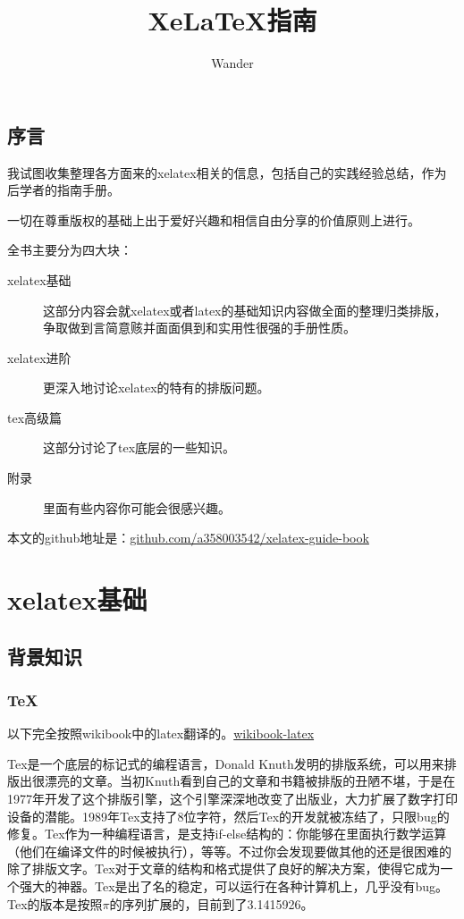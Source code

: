 \documentclass[12pt,oneside]{book}
\title{XeLaTeX指南}
\author{Wander}
\begin{document}


\frontmatter 
{}
\chapter*{序言}
我试图收集整理各方面来的xelatex相关的信息，包括自己的实践经验总结，作为后学者的指南手册。

一切在尊重版权的基础上出于爱好兴趣和相信自由分享的价值原则上进行。

全书主要分为四大块：
\begin{description}
\item[xelatex基础] 这部分内容会就xelatex或者latex的基础知识内容做全面的整理归类排版，争取做到言简意赅并面面俱到和实用性很强的手册性质。

\item[xelatex进阶] 更深入地讨论xelatex的特有的排版问题。

\item[tex高级篇] 这部分讨论了tex底层的一些知识。

\item[附录] 里面有些内容你可能会很感兴趣。
\end{description}


本文的github地址是：\href{https://github.com/a358003542/xelatex-guide-book}{github.com/a358003542/xelatex-guide-book}



\setcounter{tocdepth}{2}    
\tableofcontents


\mainmatter 
\part{xelatex基础}
\chapter{背景知识}
\section{TeX}
以下完全按照wikibook中的latex翻译的。\href{http://en.wikibooks.org/wiki/LaTeX/Introduction}{wikibook-latex}

Tex是一个底层的标记式的编程语言，Donald Knuth发明的排版系统，可以用来排版出很漂亮的文章。当初Knuth看到自己的文章和书籍被排版的丑陋不堪，于是在1977年开发了这个排版引擎，这个引擎深深地改变了出版业，大力扩展了数字打印设备的潜能。1989年Tex支持了8位字符，然后Tex的开发就被冻结了，只限bug的修复。Tex作为一种编程语言，是支持if-else结构的：你能够在里面执行数学运算（他们在编译文件的时候被执行），等等。不过你会发现要做其他的还是很困难的除了排版文字。Tex对于文章的结构和格式提供了良好的解决方案，使得它成为一个强大的神器。Tex是出了名的稳定，可以运行在各种计算机上，几乎没有bug。Tex的版本是按照$\pi$的序列扩展的，目前到了3.1415926。
\end{document}
